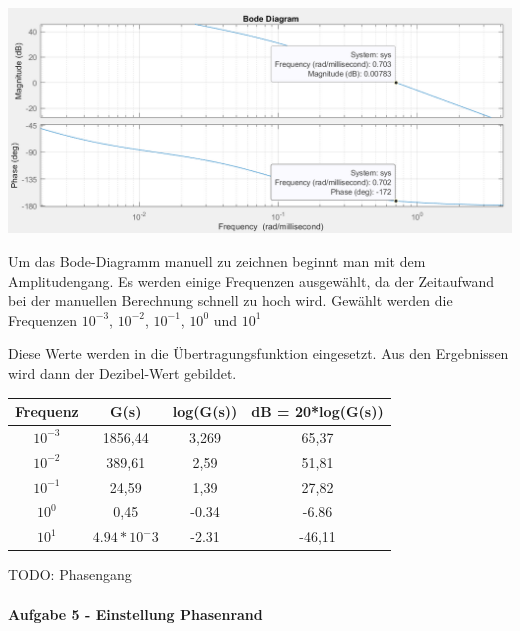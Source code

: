 \documentclass[            %
draft = false,             		%
paper = A4,                		%
pagesize = pdftex,         		%
fontsize = 10pt,           		%
DIV=15,                    		%
twoside = false,           		%
twocolumn = false,         		%
parskip = full,           		%
chapterprefix = false,      		%
appendixprefix = true,     		%
headinclude = false,       		%
footinclude = false,       		%
mpinclude = false,         		%
numbers = auto,            		%
cleardoublepage = plain,   		%
footnotes = multiple,      		%
titlepage = true,          		%
headings = normal,         		%
open = right,              		%
bibliography = openstyle,  		%
listof = chaptergapline,   		%
overfullrule = true,
]{scrbook}
\begin{document}
\begin{center}
   \begin{minipage}[b]{1.0\textwidth}
      \includegraphics[scale=0.7]{Bilder/Phasenrand.PNG}
      \label{fig:Phasenrand} 
   \end{minipage}
\end{center}

Um das Bode-Diagramm manuell zu zeichnen beginnt man mit dem Amplitudengang.
Es werden einige Frequenzen ausgewählt, da der Zeitaufwand bei der manuellen Berechnung schnell zu hoch wird.
Gewählt werden die Frequenzen $10^{-3}$, $10^{-2}$, $10^{-1}$, $10^{0}$ und $10^{1}$

Diese Werte werden in die Übertragungsfunktion eingesetzt. Aus den Ergebnissen wird dann der Dezibel-Wert gebildet.

\begin{center}
\begin{tabular}{|c c c c|} 
 \hline
 Frequenz & G(s) & log(G(s)) & dB = 20*log(G(s)) \\ [0.5ex] 
 \hline
 $10^{-3}$ & 1856,44 & 3,269 & 65,37 \\
 \hline
 $10^{-2}$ & 389,61 & 2,59 & 51,81 \\
 \hline
 $10^{-1}$ & 24,59 & 1,39 & 27,82 \\
 \hline
 $10^{0}$ & 0,45 & -0.34 & -6.86 \\
 \hline
 $10^{1}$ & $4.94*10^-3$ & -2.31 & -46,11 \\
 \hline
\end{tabular}
\end{center}

TODO: Phasengang





\paragraph{Aufgabe 5 - Einstellung Phasenrand}~\\
\end{document}
